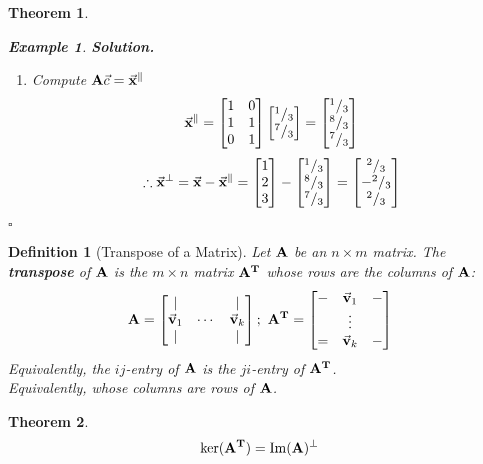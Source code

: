 \documentclass[12pt, a4paper]{article}
\newtheorem{thm}{Theorem}[subsection]
\newtheorem{df}{Definition}[subsection]
\newtheorem{eg}{Example}[subsection]
\newenvironment*{sol}{\par\indent\textbf{\textit{Solution. }}}{\hfill{$\square$}\par}
\def\T{{\vb{T}}}
\def\IM{{\mathrm{Im}}}
\def\vecx{\va{x}}
\def\vecv{\va{v}}
\def\matrixA{\vb{A}}
\begin{document}
\begin{thm}
\begin{eg}
\begin{sol}
\begin{enumerate}
				\item Compute $\matrixA\vec{c}=\vecx^\parallel$
				\[\vecx^\parallel=\begin{bmatrix}1&0\\1&1\\0&1\end{bmatrix}\begin{bmatrix}^1/_3\\^7/_3\end{bmatrix}=\begin{bmatrix}^1/_3\\^8/_3\\^7/_3\end{bmatrix}\]
				\[\therefore\vecx^\perp=\vecx-\vecx^\parallel=\begin{bmatrix}1\\2\\3\end{bmatrix}-\begin{bmatrix}^1/_3\\^8/_3\\^7/_3\end{bmatrix}=\begin{bmatrix}^2/_3\\-^2/_3\\^2/_3\end{bmatrix}\]
			\end{enumerate}
		\end{sol}
	\end{eg}
\end{thm}
\begin{df}[Transpose of a Matrix]
	Let $\matrixA$ be an $n\times m$ matrix. The \textbf{transpose} of $\matrixA$ is the $m\times n$ matrix $\matrixA^\T$ whose rows are the columns of $\matrixA$: \[\matrixA=\begin{bmatrix}|&&|\\\vecv_1&\cdots&\vecv_k\\|&&|\end{bmatrix};\ \matrixA^\T=\begin{bmatrix}-&\vecv_1&-\\&\vdots&\\=&\vecv_k&-\end{bmatrix}\]	
	Equivalently, the $ij$-entry of $\matrixA$ is the $ji$-entry of $\matrixA^\T$.\\
	Equivalently, whose columns are rows of $\matrixA$.
\end{df}
\begin{thm}
	\[\ker(\matrixA^\T)=\IM(\matrixA)^\perp\]	
\end{thm}
\end{document}
